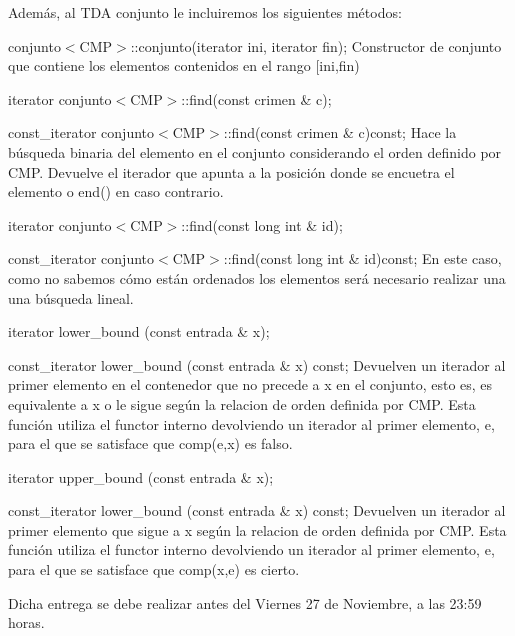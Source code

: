 Además, al T\-D\-A conjunto le incluiremos los siguientes métodos\-: \begin{DoxyItemize}
\item conjunto$<$\-C\-M\-P$>$\-::conjunto(iterator ini, iterator fin); Constructor de conjunto que contiene los elementos contenidos en el rango \mbox{[}ini,fin) \item iterator conjunto$<$\-C\-M\-P$>$\-::find(const crimen \& c); \item const\-\_\-iterator conjunto$<$\-C\-M\-P$>$\-::find(const crimen \& c)const; Hace la búsqueda binaria del elemento en el conjunto considerando el orden definido por C\-M\-P. Devuelve el iterador que apunta a la posición donde se encuetra el elemento o end() en caso contrario. \item iterator conjunto$<$\-C\-M\-P$>$\-::find(const long int \& id); \item const\-\_\-iterator conjunto$<$\-C\-M\-P$>$\-::find(const long int \& id)const; En este caso, como no sabemos cómo están ordenados los elementos será necesario realizar una una búsqueda lineal. \item iterator lower\-\_\-bound (const entrada \& x); \item const\-\_\-iterator lower\-\_\-bound (const entrada \& x) const; Devuelven un iterador al primer elemento en el contenedor que no precede a x en el conjunto, esto es, es equivalente a x o le sigue según la relacion de orden definida por C\-M\-P. Esta función utiliza el functor interno devolviendo un iterador al primer elemento, e, para el que se satisface que comp(e,x) es falso. \item iterator upper\-\_\-bound (const entrada \& x); \item const\-\_\-iterator lower\-\_\-bound (const entrada \& x) const; Devuelven un iterador al primer elemento que sigue a x según la relacion de orden definida por C\-M\-P. Esta función utiliza el functor interno devolviendo un iterador al primer elemento, e, para el que se satisface que comp(x,e) es cierto.\end{DoxyItemize}
Dicha entrega se debe realizar antes del Viernes 27 de Noviembre, a las 23\-:59 horas. 